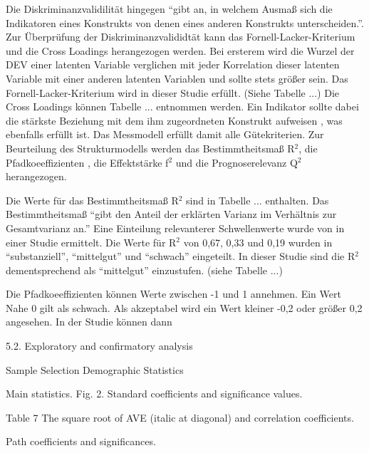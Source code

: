 Die Diskriminanzvalidilität hingegen "`gibt an, in welchem Ausmaß sich die Indikatoren eines Konstrukts von denen eines anderen Konstrukts unterscheiden."'\parencite[S.26]{nitzl2010anwenderorientierte}. Zur Überprüfung der Diskriminanzvalididtät kann das Fornell-Lacker-Kriterium und die Cross Loadings herangezogen werden. 
Bei ersterem wird die Wurzel der DEV einer latenten Variable verglichen mit jeder Korrelation dieser latenten Variable mit einer anderen latenten Variablen und sollte stets größer sein.\parencite[vgl.][S.26]{nitzl2010anwenderorientierte} Das Fornell-Lacker-Kriterium wird in dieser Studie erfüllt. (Siehe Tabelle ...) Die Cross Loadings können Tabelle ... entnommen werden. Ein Indikator sollte dabei die stärkste Beziehung mit dem ihm zugeordneten Konstrukt aufweisen \parencite[vgl.][S.26]{nitzl2010anwenderorientierte}, was ebenfalls erfüllt ist.   \nocite{fornell1981evaluating}
Das Messmodell erfüllt damit alle Gütekriterien. Zur Beurteilung des Strukturmodells werden das Bestimmtheitsmaß R$^2$, die Pfadkoeeffizienten , die Effektstärke f$^2$ und die Prognoserelevanz Q$^2$ herangezogen.  

Die Werte für das Bestimmtheitsmaß R$^2$ sind in Tabelle ... enthalten. Das Bestimmtheitsmaß "`gibt den Anteil der erklärten Varianz im Verhältnis zur Gesamtvarianz an."'\parencite[S.32]{nitzl2010anwenderorientierte} Eine Einteilung relevanterer Schwellenwerte wurde von \cite[S.323]{chin1998partial} in einer Studie ermittelt. Die Werte für R$^2$ von 0,67, 0,33 und 0,19 wurden in "`substanziell"', "`mittelgut"' und "`schwach"' eingeteilt. In dieser Studie sind die R$^2$ dementsprechend als "`mittelgut"' einzustufen. (siehe Tabelle ...)

Die Pfadkoeeffizienten können Werte zwischen -1 und 1 annehmen. Ein Wert Nahe 0 gilt als schwach. Als akzeptabel wird ein Wert kleiner -0,2 oder größer 0,2 angesehen.\parencite[vgl.][S.11]{chin1998commentary} In der Studie können dann 


5.2. Exploratory and confirmatory analysis

Sample Selection
Demographic Statistics

Main statistics.
Fig. 2. Standard coefficients and significance values.

Table 7
The square root of AVE (italic at diagonal) and correlation coefficients.

Path coefficients and significances.












